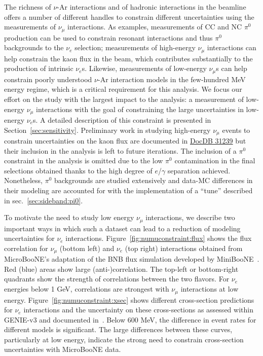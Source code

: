 \par The richness of $\nu$-Ar interactions and of hadronic interactions in the beamline offers a number of different handles 
to constrain different uncertainties using the measurements of $\nu_{\mu}$ interactions.
As examples, measurements of CC and NC $\pi^0$ production can be used to constrain resonant interactions and thus $\pi^0$ backgrounds to the $\nu_e$ selection; measurements of high-energy $\nu_{\mu}$ interactions can help constrain the kaon flux in the beam, which contributes substantially to the production of intrinsic $\nu_e$s. Likewise, measurements of low-energy $\nu_{\mu}$s can help constrain poorly understood $\nu$-Ar interaction models in the few-hundred MeV energy regime, which is a critical requirement for this analysis. We focus our effort on the study with the largest impact to the analysis: a measurement of low-energy $\nu_{\mu}$ interactions with the goal of constraining the large uncertainties in low-energy $\nu_e$s. A detailed  description of this constraint is presented in Section~\ref{sec:sensitivity}. Preliminary work in studying high-energy $\nu_{\mu}$ events to constrain uncertainties on the kaon flux are documented in \href{https://microboone-docdb.fnal.gov/cgi-bin/private/ShowDocument?docid=31239}{DocDB 31239} but their inclusion in the analysis is left to future iterations. The inclusion of a $\pi^0$ constraint in the analysis is omitted due to the low $\pi^0$ contamination in the final selections obtained thanks to the high degree of $e$/$\gamma$ separation achieved. Nonetheless, $\pi^0$ backgrounds are studied extensively and data-MC differences in their modeling are accounted for with the implementation of a ``tune'' described in sec.~\ref{sec:sideband:pi0}.
\par To motivate the need to study low energy $\nu_{\mu}$ interactions, we describe two important ways in which such a dataset can lead to a reduction of modeling uncertainties for $\nu_e$ interactions. Figure~\ref{fig:numuconstraint:flux} shows the flux correlation for $\nu_{\mu}$ (bottom left) and $\nu_e$ (top right) interactions obtained from MicroBooNE's adaptation of the BNB flux simulation developed by MiniBooNE~\cite{bib:fluxmcc9,bib:fluxtechnote}. Red (blue) areas show large (anti-)correlation. The top-left or bottom-right quadrants show the strength of correlations between the two flavors. For $\nu_e$ energies below 1 GeV, correlations are strongest with $\nu_{\mu}$ interactions at low energy. Figure~\ref{fig:numuconstraint:xsec} shows different cross-section predictions for $\nu_{e}$ interactions and the uncertainty on these cross-sections as assessed within GENIE-v3 and documented in~\cite{bib:1074}. Below 600 MeV, the difference in event rates for different models is significant. The large differences between these curves, particularly at low energy, indicate the strong need to constrain cross-section uncertainties with MicroBooNE data. 
